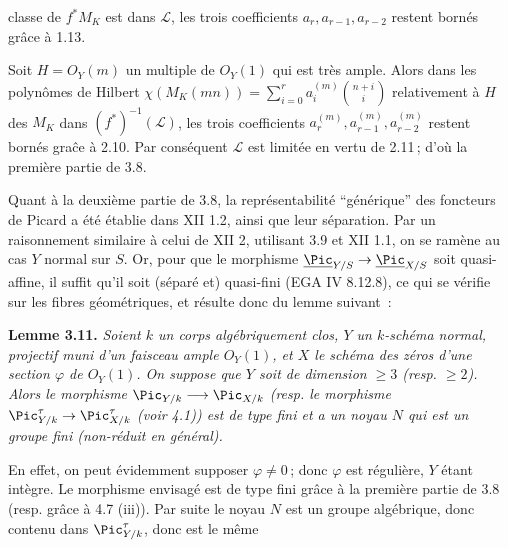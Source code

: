 
classe de \(f^*M_K\) est dans \(\mathcal L\), les trois coefficients \(a_r,a_{r-1},a_{r-2}\) restent born\'es gr\^ace \`a 1.13.

Soit \(H={O}_Y(m)\) un multiple de \({O}_Y(1)\) qui est tr\`es ample. Alors dans les polyn\^omes de Hilbert \(\chi(M_K(mn))=\sum_{i=0}^{r}a_i^{(m)}\binom{n+i}{i}\) relativement \`a \(H\) des \(M_K\) dans \((f^*)^{-1}(\mathcal L)\), les trois coefficients \(a_r^{(m)},a_{r-1}^{(m)},a_{r-2}^{(m)}\) restent born\'es gra\^ce \`a 2.10. Par cons\'equent \(\mathcal L\) est limit\'ee en vertu de 2.11\,; d'o\`u la premi\`ere partie de 3.8.

Quant \`a la deuxi\`eme partie de 3.8, la repr\'esentabilit\'e ``g\'en\'erique'' des foncteurs de Picard a \'et\'e \'etablie dans XII 1.2, ainsi que leur s\'eparation. Par un raisonnement similaire \`a celui de XII 2, utilisant 3.9 et XII 1.1, on se ram\`ene au cas \(Y\) normal sur \(S\). Or, pour que le morphisme \(\underline{\Pic}_{Y/S}\to\underline{\Pic}_{X/S}\) soit quasi-affine, il suffit qu'il soit (s\'epar\'e et) quasi-fini (EGA IV 8.12.8), ce qui se v\'erifie sur les fibres g\'eom\'etriques, et r\'esulte donc du lemme suivant~:

\textbf{Lemme 3.11.} \emph{Soient \(k\) un corps alg\'ebriquement clos, \(Y\) un \(k\)-sch\'ema normal, projectif muni d'un faisceau ample \({O}_Y(1)\), et \(X\) le sch\'ema des z\'eros d'une section \(\varphi\) de \({O}_Y(1)\). On suppose que \(Y\) soit de dimension \(\ge3\) (resp. \(\ge2\)). Alors le morphisme \(\Pic_{Y/k}\longrightarrow\Pic_{X/k}\) (resp. le morphisme \(\Pic^\tau_{Y/k}\to\Pic^\tau_{X/k}\) (voir 4.1)) est de type fini et a un noyau \(N\) qui est un groupe fini (non-r\'eduit en g\'en\'eral).}

En effet, on peut \'evidemment supposer \(\varphi\ne0\)\,; donc \(\varphi\) est r\'eguli\`ere, \(Y\) \'etant int\`egre. Le morphisme envisag\'e est de type fini gr\^ace \`a la premi\`ere partie de 3.8 (resp. gr\^ace \`a 4.7 (iii)). Par suite le noyau \(N\) est un groupe alg\'ebrique, donc contenu dans \(\Pic^\tau_{Y/k}\), donc est le m\^eme
